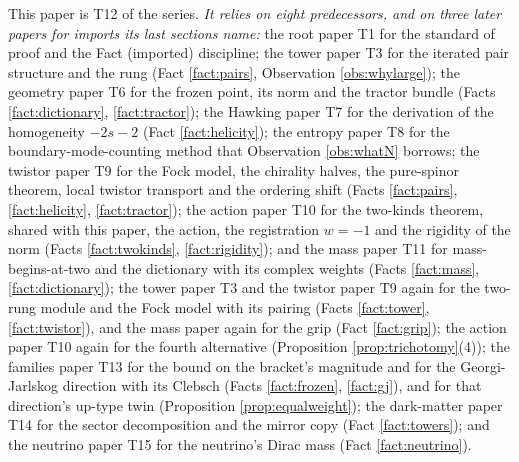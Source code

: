 \documentclass[11pt]{article}
\theoremstyle{definition}
\begin{document}
This paper is T12 of the series. \emph{It relies on eight predecessors, and on three later papers for imports its last sections name:} the root paper T1 \cite{ButlerT1} for the standard of proof and the Fact (imported) discipline; the tower paper T3 \cite{ButlerT3} for the iterated pair structure and the rung (Fact \ref{fact:pairs}, Observation \ref{obs:whylarge}); the geometry paper T6 \cite{ButlerT6} for the frozen point, its norm and the tractor bundle (Facts \ref{fact:dictionary}, \ref{fact:tractor}); the Hawking paper T7 \cite{ButlerT7} for the derivation of the homogeneity $-2s-2$ (Fact \ref{fact:helicity}); the entropy paper T8 \cite{ButlerT8} for the boundary-mode-counting method that Observation \ref{obs:whatN} borrows; the twistor paper T9 \cite{ButlerT9} for the Fock model, the chirality halves, the pure-spinor theorem, local twistor transport and the ordering shift (Facts \ref{fact:pairs}, \ref{fact:helicity}, \ref{fact:tractor}); the action paper T10 \cite{ButlerT10} for the two-kinds theorem, shared with this paper, the action, the registration $w = -1$ and the rigidity of the norm (Facts \ref{fact:twokinds}, \ref{fact:rigidity}); and the mass paper T11 \cite{ButlerT11} for mass-begins-at-two and the dictionary with its complex weights (Facts \ref{fact:mass}, \ref{fact:dictionary}); the tower paper T3 and the twistor paper T9 again for the two-rung module and the Fock model with its pairing (Facts \ref{fact:tower}, \ref{fact:twistor}), and the mass paper again for the grip (Fact \ref{fact:grip}); the action paper T10 again for the fourth alternative (Proposition \ref{prop:trichotomy}(4)); the families paper T13 \cite{ButlerT13} for the bound on the bracket's magnitude and for the Georgi-Jarlskog direction with its Clebsch (Facts \ref{fact:frozen}, \ref{fact:gj}), and for that direction's up-type twin (Proposition \ref{prop:equalweight}); the dark-matter paper T14 \cite{ButlerT14} for the sector decomposition and the mirror copy (Fact \ref{fact:towers}); and the neutrino paper T15 \cite{ButlerT15} for the neutrino's Dirac mass (Fact \ref{fact:neutrino}).
\end{document}
